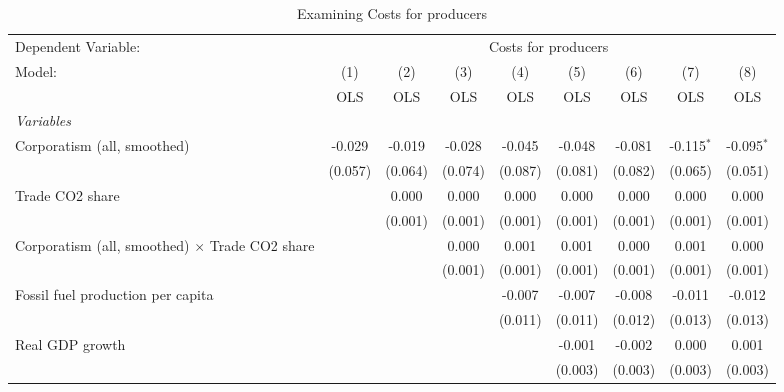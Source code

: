 
\begin{table}[htbp]
   \caption{Examining Costs for producers}
   \centering
   \begin{tabular}{lcccccccc}
      \toprule
      Dependent Variable: & \multicolumn{8}{c}{Costs for producers}\\
      Model:                                                & (1)     & (2)     & (3)     & (4)     & (5)     & (6)     & (7)          & (8)\\  
                                                            &  OLS    & OLS     & OLS     & OLS     & OLS     & OLS     & OLS          & OLS\\  
      \midrule
      \emph{Variables}\\
      Corporatism (all, smoothed)                           & -0.029  & -0.019  & -0.028  & -0.045  & -0.048  & -0.081  & -0.115$^{*}$ & -0.095$^{*}$\\   
                                                            & (0.057) & (0.064) & (0.074) & (0.087) & (0.081) & (0.082) & (0.065)      & (0.051)\\   
      Trade CO2 share                                       &         & 0.000   & 0.000   & 0.000   & 0.000   & 0.000   & 0.000        & 0.000\\   
                                                            &         & (0.001) & (0.001) & (0.001) & (0.001) & (0.001) & (0.001)      & (0.001)\\   
      Corporatism (all, smoothed) $\times$ Trade CO2 share  &         &         & 0.000   & 0.001   & 0.001   & 0.000   & 0.001        & 0.000\\   
                                                            &         &         & (0.001) & (0.001) & (0.001) & (0.001) & (0.001)      & (0.001)\\   
      Fossil fuel production per capita                     &         &         &         & -0.007  & -0.007  & -0.008  & -0.011       & -0.012\\   
                                                            &         &         &         & (0.011) & (0.011) & (0.012) & (0.013)      & (0.013)\\   
      Real GDP growth                                       &         &         &         &         & -0.001  & -0.002  & 0.000        & 0.001\\   
                                                            &         &         &         &         & (0.003) & (0.003) & (0.003)      & (0.003)\\   

\end{tabular}
\end{table}
